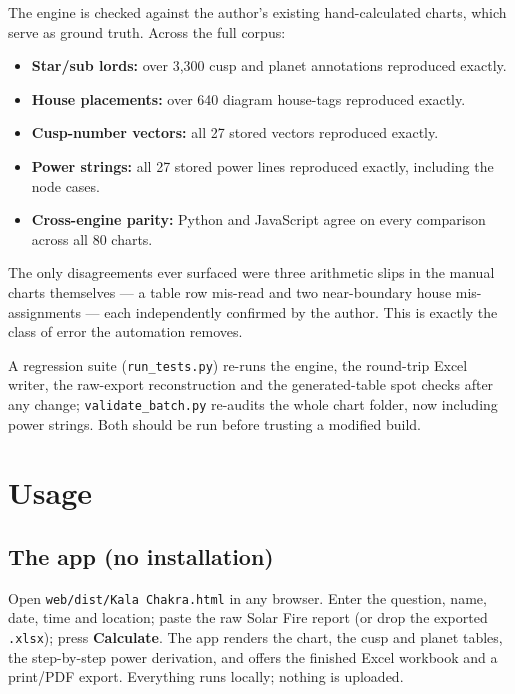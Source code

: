 \documentclass[11pt, a4paper]{article}
\newcommand{\code}[1]{\texttt{#1}}
\begin{document}
The engine is checked against the author's existing hand-calculated charts,
which serve as ground truth. Across the full corpus:

\begin{itemize}[leftmargin=1.4em]
  \item \textbf{Star/sub lords:} over 3{,}300 cusp and planet annotations
    reproduced exactly.
  \item \textbf{House placements:} over 640 diagram house-tags reproduced
    exactly.
  \item \textbf{Cusp-number vectors:} all 27 stored vectors reproduced exactly.
  \item \textbf{Power strings:} all 27 stored power lines reproduced exactly,
    including the node cases.
  \item \textbf{Cross-engine parity:} Python and JavaScript agree on every
    comparison across all 80 charts.
\end{itemize}

The only disagreements ever surfaced were three arithmetic slips in the manual
charts themselves --- a table row mis-read and two near-boundary house
mis-assignments --- each independently confirmed by the author. This is exactly
the class of error the automation removes.

\begin{notebox}
A regression suite (\code{run\_tests.py}) re-runs the engine, the round-trip
Excel writer, the raw-export reconstruction and the generated-table spot checks
after any change; \code{validate\_batch.py} re-audits the whole chart folder,
now including power strings. Both should be run before trusting a modified
build.
\end{notebox}

\section{Usage}

\subsection{The app (no installation)}

Open \code{web/dist/Kala Chakra.html} in any browser. Enter the question, name, date,
time and location; paste the raw Solar Fire report (or drop the exported
\code{.xlsx}); press \textbf{Calculate}. The app renders the chart, the cusp and
planet tables, the step-by-step power derivation, and offers the finished Excel
workbook and a print/PDF export. Everything runs locally; nothing is uploaded.
\end{document}
